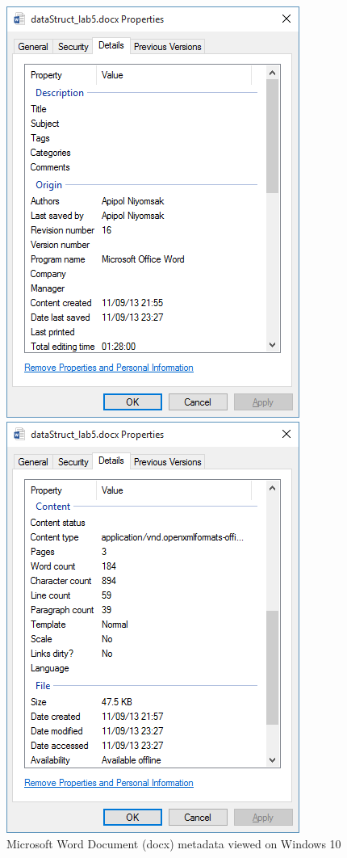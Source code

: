 \begin{figure}[h]
	\centering
	\begin{minipage}{0.45\textwidth}
		\centering
		\includegraphics*[scale=0.6]{res/bg-knowledge/metadata-ex-doc}
	\end{minipage} \hfill
	\begin{minipage}{0.45\textwidth}
		\centering
		\includegraphics*[scale=0.6]{res/bg-knowledge/metadata-ex-doc2}
	\end{minipage} \hfill	
	
	\caption{Microsoft Word Document (docx) metadata viewed on Windows 10}
	\label{metadata-ex-doc}
\end{figure}
